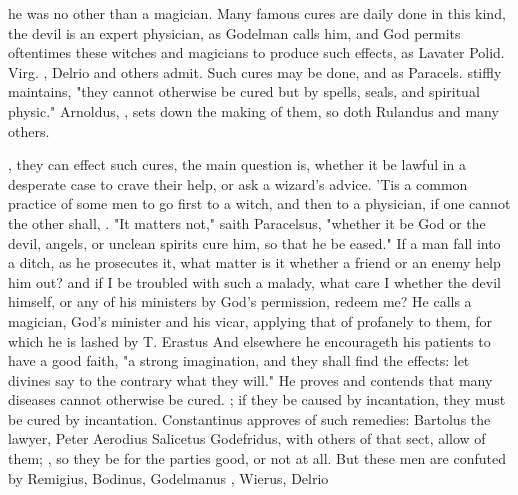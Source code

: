 {he was no other than a magician. Many famous cures are daily done in this kind,
the devil is an expert physician, as Godelman calls him,
 and God permits oftentimes these
witches and magicians to produce such effects, as Lavater
 Polid. Virg.
, Delrio and others admit. Such
cures may be done, and as Paracels.  stiffly maintains, "they cannot otherwise be
cured but by spells, seals, and spiritual physic."
Arnoldus, , sets
down the making of them, so doth Rulandus and many others.

, they can effect such cures, the main
question is, whether it be lawful in a desperate case to crave their help, or
ask a wizard's advice. 'Tis a common practice of some men to go first to a
witch, and then to a physician, if one cannot the other shall, . "It matters not,"
saith Paracelsus, "whether it be God or the devil, angels, or unclean spirits
cure him, so that he be eased." If a man fall into a ditch, as he prosecutes
it, what matter is it whether a friend or an enemy help him out? and if I be
troubled with such a malady, what care I whether the devil himself, or any of
his ministers by God's permission, redeem me? He calls a
magician, God's minister and his vicar, applying that of
 profanely to them, for which he is lashed by T. Erastus
 And elsewhere he encourageth his
patients to have a good faith, "a strong imagination, and
they shall find the effects: let divines say to the contrary what they will."
He proves and contends that many diseases cannot otherwise be cured.
; if they be caused by
incantation, they must be cured by incantation.
Constantinus  approves of such remedies: Bartolus
the lawyer, Peter Aerodius 
Salicetus Godefridus, with others of that sect, allow of them; , so they be for the parties good, or
not at all. But these men are confuted by Remigius, Bodinus,
 Godelmanus
, Wierus, Delrio }
